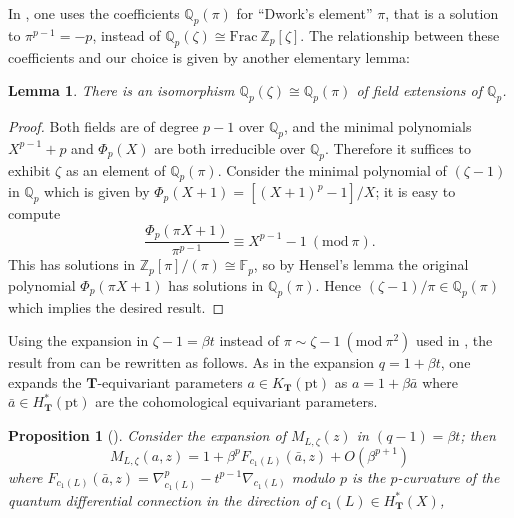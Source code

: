 \documentclass[reqno]{amsart}
\numberwithin{equation}{section}
\numberwithin{equation}{section}
\numberwithin{equation}{section}
\newtheorem{prop}[thm]{Proposition}
\newtheorem{lemma}[thm]{Lemma}
\theoremstyle{definition}
\theoremstyle{remark}
\theoremstyle{remark}
\begin{document}
In \cite{koroteev-smirnov}, one uses the coefficients $\mathbb{Q}_p(\pi)$ for ``Dwork's element'' $\pi$, that is a solution to $\pi^{p-1} = -p$, instead of $\mathbb{Q}_p(\zeta) \cong \mathrm{Frac} \ \mathbb{Z}_p[\zeta]$. The relationship between these coefficients and our choice is given by another elementary lemma:

\begin{lemma}
    There is an isomorphism $\mathbb{Q}_p(\zeta) \cong \mathbb{Q}_p(\pi)$ of field extensions of $\mathbb{Q}_p$.
\end{lemma}
\begin{proof}
    Both fields are of degree $p-1$ over $\mathbb{Q}_p$, and the minimal polynomials $X^{p-1} + p $ and $\Phi_p(X)$ are both irreducible over $\mathbb{Q}_p$. Therefore it suffices to exhibit $\zeta$ as an element of $\mathbb{Q}_p(\pi)$. Consider the minimal polynomial of $(\zeta -1)$ in $\mathbb{Q}_p$ which is given by $\Phi_p(X+1) = [(X+1)^p - 1]/X$; it is easy to compute
    \begin{equation}
        \frac{\Phi_p(\pi X+1)}{\pi^{p-1}} \equiv X^{p-1}  - 1  \ (\mathrm{mod} \ \pi) .
    \end{equation}
    This has solutions in $\mathbb{Z}_p[\pi]/(\pi) \cong \mathbb{F}_p$, so by Hensel's lemma the original polynomial $\Phi_p(\pi X+ 1) $ has solutions in $\mathbb{Q}_p(\pi)$. Hence $(\zeta-1) /\pi \in \mathbb{Q}_p(\pi)$ which implies the desired result.
\end{proof}

Using the expansion in $\zeta - 1 = \beta t$ instead of $\pi \sim \zeta - 1 \ (\mathrm{mod} \ \pi^2)$ used in \cite{koroteev-smirnov}, the result from \cite[Lemma 5.1, Section 5.4]{koroteev-smirnov} can be rewritten as follows. As in the expansion $q = 1+ \beta t$, one expands the $\mathbf{T}$-equivariant parameters $a \in K_{\mathbf{T}}(\mathrm{pt})$ as $a = 1 + \beta \bar{a}$ where $\bar{a} \in H^*_{\mathbf{T}}(\mathrm{pt})$ are the cohomological equivariant parameters. 

\begin{prop}[{\cite[Section 5.2]{koroteev-smirnov}}]\label{prop:pcurvature-cohomological-limit}
    Consider the expansion of $M_{L, \zeta}(z)$ in $(q-1) = \beta t$; then 
    \begin{equation}
        M_{L, \zeta}(a, z) = 1 + \beta^p  F_{c_1(L)}(\bar{a}, z) + O(\beta^{p+1})
    \end{equation}
    where $F_{c_1(L)}(\bar{a}, z) = \nabla^p_{c_1(L)} - t^{p-1} \nabla_{c_1(L)}$ modulo $p$ is the $p$-curvature of the quantum differential connection in the direction of $c_1(L) \in H^*_{\mathbf{T}}(X)$, 
\end{prop}
\end{document}
